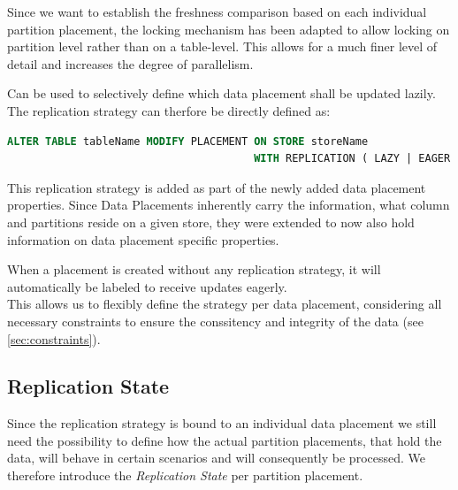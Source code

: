 
Since we want to establish the freshness comparison based on each individual partition placement, the locking mechanism
has been adapted to allow locking on partition level rather than on a table-level. 
This allows for a much finer level of detail and increases the degree of parallelism. 

Can be used to selectively define which data placement shall be updated lazily.
The replication strategy can therfore be directly defined as:
\begin{lstlisting}[language=sql, caption={SQL Stateemnt Syntax to modify the designated Replication Strategy for a Data Placement},label={lst:strategy}]
ALTER TABLE tableName MODIFY PLACEMENT ON STORE storeName 
                                       WITH REPLICATION ( LAZY | EAGER );
\end{lstlisting}

This replication strategy is added as part of the newly added data placement properties. Since Data Placements inherently carry the information, what column and partitions reside
on a given store, they were extended to now also hold information on data placement specific properties.

When a placement is created without any replication strategy, it will automatically be labeled to receive updates eagerly.\\
This allows us to flexibly define the strategy per data placement, considering all necessary constraints to ensure the conssitency and integrity of the data (see \ref{sec:constraints}).




\subsection{Replication State}
\label{sec:states}

Since the replication strategy is bound to an individual data placement we still need the possibility to 
define how the actual partition placements, that hold the data, will behave in certain scenarios and will consequently be processed.
We therefore introduce the \emph{Replication State} per partition placement.\\

